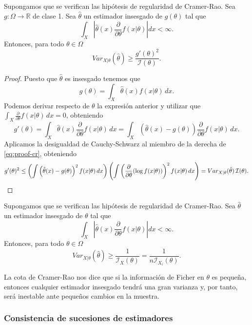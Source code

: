 \documentclass{article}
\begin{document}
    \begin{thm}
        Supongamos que se verifican las hipótesis de regularidad de Cramer-Rao. Sea $g: \Omega \to  \mathbb{R}$ de clase 1. Sea $\hat{\theta}$ un estimador insesgado de $g(\theta)$ tal que
        \[\int_X \left|\hat{\theta}(x) \frac{\partial}{\partial \theta}f(x | \theta)\right| dx < \infty.\]
        Entonces, para todo $\theta \in \Omega$
        \[Var_{X|\theta}(\hat{\theta}) \ge \frac{g'(\theta)^2}{\mathcal{I}(\theta)}.\]
    \end{thm}
    \begin{proof}
        Puesto que $\hat{\theta}$ es insesgado tenemos que
        \[g(\theta) = \int_X \hat{\theta}(x) f(x|\theta)\,dx.\]
        Podemos derivar respecto de $\theta$ la expresión anterior y utilizar que $\int_X \frac{\partial}{\partial \theta}f(x|\theta) \, dx = 0$, obteniendo
        \begin{equation}\label{eq:proof-cr}
        g'(\theta) = \int_X \hat{\theta}(x)\frac{\partial}{\partial \theta}f(x|\theta)\,dx = \int_X \left(\hat{\theta}(x) - g(\theta)\right)\frac{\partial}{\partial \theta}f(x|\theta)\,dx.
        \end{equation}
        Aplicamos la desigualdad de Cauchy-Schwarz al miembro de la derecha de \eqref{eq:proof-cr}, obteniendo
        \[g'(\theta)^2  \le \left( \int \left(\hat\theta(x) - g(\theta)\right)^2 f(x|\theta) \, dx \right) \left(\int \left( \frac{\partial}{\partial\theta} (\log f(x|\theta)) \right)^2 f(x|\theta) \, dx \right) = Var_{X|\theta}(\hat\theta) \, \mathcal{I}(\theta). \qedhere\]
    \end{proof}

    \begin{cor}
        Supongamos que se verifican las hipótesis de regularidad de Cramer-Rao. Sea $\hat{\theta}$ un estimador insesgado de $\theta$ tal que
        \[\int_X \left|\hat{\theta}(x) \frac{\partial}{\partial \theta} f(x | \theta)\right| dx < \infty.\]
        Entonces, para todo $\theta \in \Omega$
        \[Var_{X|\theta}(\hat{\theta}) \ge \frac{1}{\mathcal{I}_X(\theta)} = \frac{1}{n\mathcal{I}_{X_i}(\theta)}.\]
    \end{cor}

    La cota de Cramer-Rao nos dice que si la información de Ficher en $\theta$ es pequeña, entonces cualquier estimador insesgado tendrá una gran varianza y, por tanto, será inestable ante pequeños cambios en la muestra.

    \subsubsection{Consistencia de sucesiones de estimadores}
\end{document}
